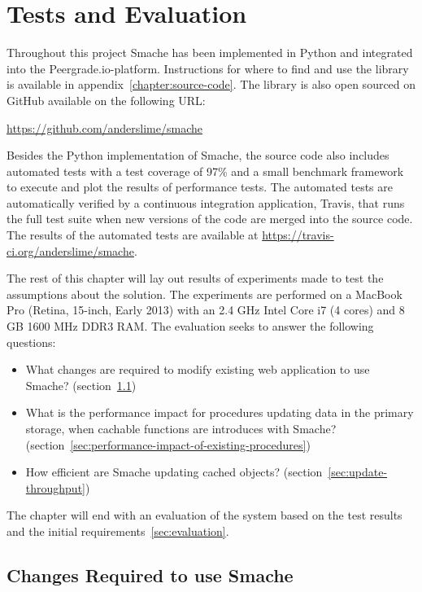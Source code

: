 \chapter{Tests and Evaluation}
\label{chapter:evaluation}

Throughout this project Smache has been implemented in Python and integrated into the Peergrade.io-platform. Instructions for where to find and use the library is available in appendix~\ref{chapter:source-code}. The library is also open sourced on GitHub available on the following URL:

\url{https://github.com/anderslime/smache}

Besides the Python implementation of Smache, the source code also includes automated tests with a test coverage of 97\% and a small benchmark framework to execute and plot the results of performance tests. The automated tests are automatically verified by a continuous integration application, Travis, that runs the full test suite when new versions of the code are merged into the source code. The results of the automated tests are available at \url{https://travis-ci.org/anderslime/smache}.

The rest of this chapter will lay out results of experiments made to test the assumptions about the solution. The experiments are performed on a MacBook Pro (Retina, 15-inch, Early 2013) with an 2.4 GHz Intel Core i7 (4 cores) and 8 GB 1600 MHz DDR3 RAM. The evaluation seeks to answer the following questions:

\begin{itemize}
  \item What changes are required to modify existing web application to use Smache? (section~\ref{sec:changes-required-to-cache-with-smache})
  \item What is the performance impact for procedures updating data in the primary storage, when cachable functions are introduces with Smache? (section~\ref{sec:performance-impact-of-existing-procedures})
  \item How efficient are Smache updating cached objects? (section~\ref{sec:update-throughput})
\end{itemize}

The chapter will end with an evaluation of the system based on the test results and the initial requirements~\ref{sec:evaluation}.

\section{Changes Required to use Smache}
\label{sec:changes-required-to-cache-with-smache}


